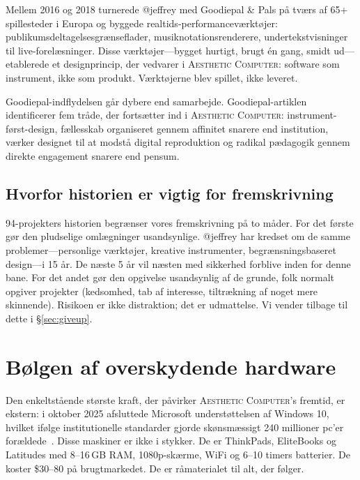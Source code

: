 \documentclass[10pt,letterpaper,twocolumn]{article}
\newcommand{\ac}{\textsc{Aesthetic Computer}}
\begin{document}
Mellem 2016 og 2018 turnerede @jeffrey med Goodiepal \& Pals på tværs af 65+ spillesteder i Europa og byggede realtids-performanceværktøjer: publikumsdeltagelsesgrænseflader, musiknotationsrenderere, undertekstvisninger til live-forelæsninger. Disse værktøjer---bygget hurtigt, brugt én gang, smidt ud---etablerede et designprincip, der vedvarer i \ac{}: software som instrument, ikke som produkt. Værktøjerne blev spillet, ikke leveret.

Goodiepal-indflydelsen går dybere end samarbejde. Goodiepal-artiklen~\citep{scudder2026goodiepal} identificerer fem tråde, der fortsætter ind i \ac{}: instrument-først-design, fællesskab organiseret gennem affinitet snarere end institution, værker designet til at modstå digital reproduktion og radikal pædagogik gennem direkte engagement snarere end pensum.

\subsection{Hvorfor historien er vigtig for fremskrivning}

94-projekters historien begrænser vores fremskrivning på to måder. For det første gør den pludselige omlægninger usandsynlige. @jeffrey har kredset om de samme problemer---personlige værktøjer, kreative instrumenter, begrænsningsbaseret design---i 15 år. De næste 5 år vil næsten med sikkerhed forblive inden for denne bane. For det andet gør den opgivelse usandsynlig af de grunde, folk normalt opgiver projekter (kedsomhed, tab af interesse, tiltrækning af noget mere skinnende). Risikoen er ikke distraktion; det er udmattelse. Vi vender tilbage til dette i \S\ref{sec:giveup}.


\section{Bølgen af overskydende hardware}
\label{sec:surplus}

Den enkeltstående største kraft, der påvirker \ac{}'s fremtid, er ekstern: i oktober 2025 afsluttede Microsoft understøttelsen af Windows 10, hvilket ifølge institutionelle standarder gjorde skønsmæssigt 240 millioner pc'er forældede~\citep{ewaste2024monitor}. Disse maskiner er ikke i stykker. De er ThinkPads, EliteBooks og Latitudes med 8--16\,GB RAM, 1080p-skærme, WiFi og 6--10 timers batterier. De koster \$30--80 på brugtmarkedet. De er råmaterialet til alt, der følger.
\end{document}
